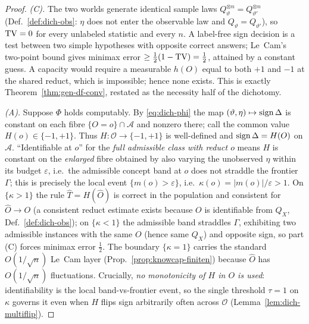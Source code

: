 \begin{proof}
\emph{(C).} The two worlds generate identical sample laws $Q_\vartheta^{\otimes n}
=Q_{\vartheta'}^{\otimes n}$ (Def.~\ref{def:dich-obs}: $\eta$ does not enter the
observable law and $Q_\vartheta=Q_{\vartheta'}$), so $\mathrm{TV}=0$ for every unlabeled
statistic and every $n$. A label-free sign decision is a test between two simple
hypotheses with opposite correct answers; Le~Cam's two-point bound gives minimax
error $\ge\tfrac12(1-\mathrm{TV})=\tfrac12$, attained by a constant guess. A capacity would
require a measurable $h(O)$ equal to both $+1$ and $-1$ at the shared reduct, which is
impossible; hence none exists. This is exactly Theorem~\ref{thm:gen-df-conv}, restated
as the necessity half of the dichotomy.

\emph{(A).} Suppose $\Phi$ holds computably. By \eqref{eq:dich-phi} the map
$(\vartheta,\eta)\mapsto\operatorname{sign}\Delta$ is constant on each fibre $\{O=o\}\cap\mathcal A$
and nonzero there; call the common value $H(o)\in\{-1,+1\}$. Thus $H:\mathcal O\to
\{-1,+1\}$ is well-defined and $\operatorname{sign}\Delta=H(O)$ on $\mathcal A$. ``Identifiable at
$o$'' for the \emph{full admissible class with reduct $o$} means $H$ is constant on the
\emph{enlarged} fibre obtained by also varying the unobserved $\eta$ within its budget
$\varepsilon$, i.e.\ the admissible concept band at $o$ does not straddle the frontier
$\Gamma$; this is precisely the local event $\{m(o)>\varepsilon\}$, i.e.\
$\kappa(o)=|m(o)|/\varepsilon>1$. On $\{\kappa>1\}$ the rule $\hat T=H(\hat O)$ is
correct in the population and consistent for $\hat O\to O$ (a consistent reduct
estimate exists because $O$ is identifiable from $Q_X$, Def.~\ref{def:dich-obs}); on
$\{\kappa<1\}$ the admissible band straddles $\Gamma$, exhibiting two admissible
instances with the same $O$ (hence same $Q_X$) and opposite sign, so part (C) forces
minimax error $\tfrac12$. The boundary $\{\kappa=1\}$ carries the standard $O(1/\sqrt n)$
Le~Cam layer (Prop.~\ref{prop:knowcap-finiten}) because $\hat O$ has $O(1/\sqrt n)$
fluctuations. Crucially, \emph{no monotonicity of $H$ in $O$ is used}: identifiability
is the local band-vs-frontier event, so the single threshold $\tau=1$ on $\kappa$
governs it even when $H$ flips sign arbitrarily often across $\mathcal O$
(Lemma~\ref{lem:dich-multiflip}).
\end{proof}

